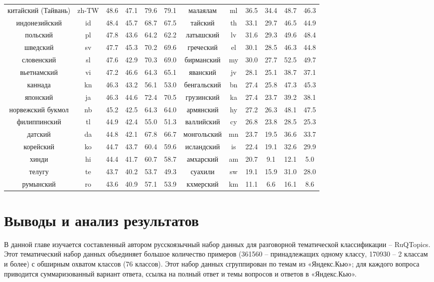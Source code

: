 \begin{table*}
{\begin{tabular}{|c|c|c|c|c|c||c|c|c|c|c|c|}
китайский (Тайвань) & zh-TW & 48.6 & 47.1 & 79.6 & 79.1 & малаялам & ml & 36.5 & 34.4 & 48.7 & 46.3\\
индонезийский & id & 48.4 & 45.7 & 68.7 & 67.5 & тайский & th & 33.1 & 29.7 & 46.5 & 44.9\\
польский & pl & 47.8 & 43.6 & 64.2 & 62.2 & латышский & lv & 31.6 & 29.3 & 49.6 & 48.4\\
шведский & sv & 47.7 & 45.3 & 70.2 & 69.6 & греческий & el & 30.1 & 28.5 & 46.3 & 44.8\\
словенский & sl & 47.6 & 42.9 & 70.3 & 69.0 & бирманский & my & 30.0 & 27.7 & 52.5 & 49.7\\
вьетнамский & vi & 47.2 & 46.6 & 64.3 & 65.1 & яванский & jv & 28.1 & 25.1 & 38.7 & 37.1\\
каннада & kn & 46.3 & 43.2 & 56.1 & 53.0 & бенгальский & bn & 27.4 & 25.8 & 47.3 & 45.3\\
японский & ja & 46.3 & 44.6 & 72.4 & 70.5 & грузинский & ka & 27.4 & 23.7 & 39.2 & 38.1\\
норвежский букмол & nb & 45.2 & 42.5 & 64.3 & 64.0 & армянский & hy & 27.2 & 26.3 & 48.1 & 47.5\\
филиппинский & tl & 44.9 & 42.4 & 55.0 & 51.3 & валлийский & cy & 26.8 & 23.8 & 28.5 & 25.3\\
датский & da & 44.8 & 42.1 & 67.8 & 66.7 & монгольский & mn & 23.7 & 19.5 & 36.6 & 33.7\\
корейский & ko & 44.7 & 43.7 & 60.4 & 59.6 & исландский & is & 22.4 & 19.1 & 32.6 & 29.9\\
хинди & hi & 44.4 & 41.7 & 60.7 & 58.7 & амхарский & am & 20.7 & 9.1 & 12.1 & 5.0\\ 
телугу & te & 43.7 & 40.2 & 53.7 & 49.3 & суахили & sw & 19.1 & 15.9 & 31.0 & 28.0\\
румынский & ro & 43.6 & 40.9 & 57.1 & 53.9 & кхмерский & km & 11.1 & 6.6 & 16.1 & 8.6\\
\hline
\end{tabular}
}
\end{table*}

\section{Выводы и анализ результатов} 

В данной главе изучается составленный автором русскоязычный набор данных для разговорной тематической классификации -- {RuQTopics}. Этот тематический набор данных объединяет большое количество примеров (361560 -- принадлежащих одному классу, 170930 -- 2 классам и более) с обширным охватом классов (76 классов). Этот набор данных сгруппирован по темам из «Яндекс.Кью»; для каждого вопроса приводится суммаризованный вариант ответа, ссылка на полный ответ и темы вопросов и ответов в «Яндекс.Кью».

